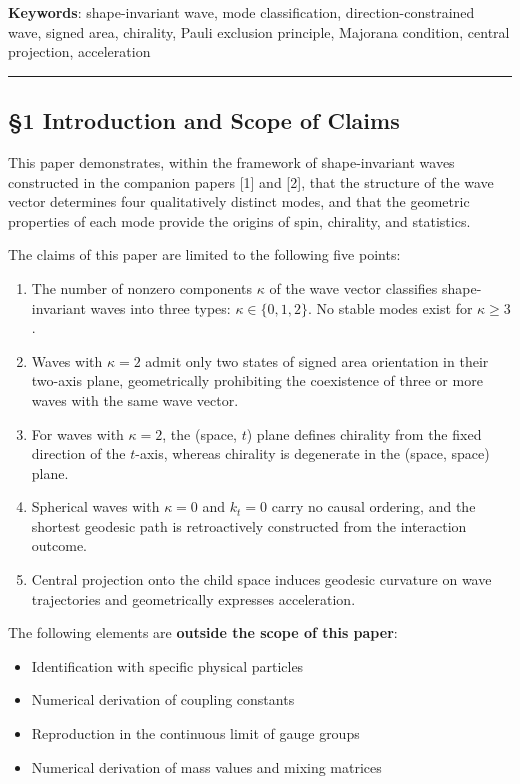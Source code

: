 \documentclass[
  a4paper,11pt]{article}
\providecommand{\tightlist}{%
  \setlength{\itemsep}{0pt}\setlength{\parskip}{0pt}}
\theoremstyle{definition}
\theoremstyle{remark}
\begin{document}
\textbf{Keywords}: shape-invariant wave, mode classification,
direction-constrained wave, signed area, chirality, Pauli exclusion
principle, Majorana condition, central projection, acceleration

\begin{center}\rule{0.5\linewidth}{0.5pt}\end{center}

\subsection{§1 Introduction and Scope of
Claims}\label{introduction-and-scope-of-claims}

This paper demonstrates, within the framework of shape-invariant waves
constructed in the companion papers {[}1{]} and {[}2{]}, that the
structure of the wave vector determines four qualitatively distinct
modes, and that the geometric properties of each mode provide the
origins of spin, chirality, and statistics.

The claims of this paper are limited to the following five points:

\begin{enumerate}
\def\labelenumi{\arabic{enumi}.}
\tightlist
\item
  The number of nonzero components \(\kappa\) of the wave vector
  classifies shape-invariant waves into three types:
  \(\kappa \in \{0, 1, 2\}\). No stable modes exist for
  \(\kappa \geq 3\).
\item
  Waves with \(\kappa = 2\) admit only two states of signed area
  orientation in their two-axis plane, geometrically prohibiting the
  coexistence of three or more waves with the same wave vector.
\item
  For waves with \(\kappa = 2\), the (space, \(t\)) plane defines
  chirality from the fixed direction of the \(t\)-axis, whereas
  chirality is degenerate in the (space, space) plane.
\item
  Spherical waves with \(\kappa = 0\) and \(k_t = 0\) carry no causal
  ordering, and the shortest geodesic path is retroactively constructed
  from the interaction outcome.
\item
  Central projection onto the child space induces geodesic curvature on
  wave trajectories and geometrically expresses acceleration.
\end{enumerate}

The following elements are \textbf{outside the scope of this paper}:

\begin{itemize}
\tightlist
\item
  Identification with specific physical particles
\item
  Numerical derivation of coupling constants
\item
  Reproduction in the continuous limit of gauge groups
\item
  Numerical derivation of mass values and mixing matrices
\end{itemize}
\end{document}
